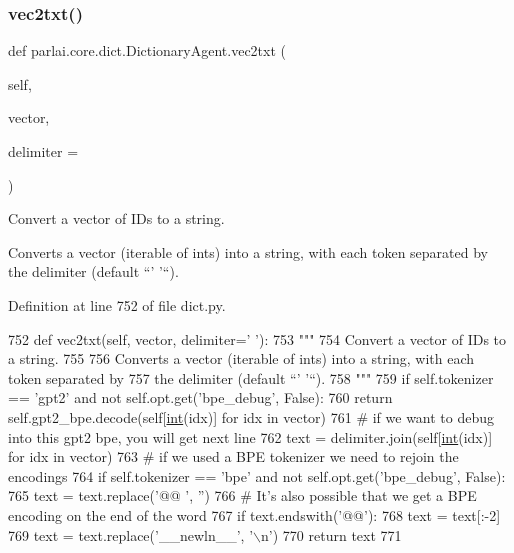 \subsubsection{\texorpdfstring{vec2txt()}{vec2txt()}}
{\footnotesize\ttfamily def parlai.\+core.\+dict.\+Dictionary\+Agent.\+vec2txt (\begin{DoxyParamCaption}\item[{}]{self,  }\item[{}]{vector,  }\item[{}]{delimiter = {\ttfamily \textquotesingle{}~\textquotesingle{}} }\end{DoxyParamCaption})}

\begin{DoxyVerb}Convert a vector of IDs to a string.

Converts a vector (iterable of ints) into a string, with each token separated by
the delimiter (default ``' '``).
\end{DoxyVerb}
 

Definition at line 752 of file dict.\+py.


\begin{DoxyCode}
752     \textcolor{keyword}{def }vec2txt(self, vector, delimiter=' '):
753         \textcolor{stringliteral}{"""}
754 \textcolor{stringliteral}{        Convert a vector of IDs to a string.}
755 \textcolor{stringliteral}{}
756 \textcolor{stringliteral}{        Converts a vector (iterable of ints) into a string, with each token separated by}
757 \textcolor{stringliteral}{        the delimiter (default ``' '``).}
758 \textcolor{stringliteral}{        """}
759         \textcolor{keywordflow}{if} self.tokenizer == \textcolor{stringliteral}{'gpt2'} \textcolor{keywordflow}{and} \textcolor{keywordflow}{not} self.opt.get(\textcolor{stringliteral}{'bpe\_debug'}, \textcolor{keyword}{False}):
760             \textcolor{keywordflow}{return} self.gpt2\_bpe.decode(self[\hyperlink{namespacelanguage__model_1_1eval__ppl_a7d12ee00479673c5c8d1f6d01faa272a}{int}(idx)] \textcolor{keywordflow}{for} idx \textcolor{keywordflow}{in} vector)
761         \textcolor{comment}{# if we want to debug into this gpt2 bpe, you will get next line}
762         text = delimiter.join(self[\hyperlink{namespacelanguage__model_1_1eval__ppl_a7d12ee00479673c5c8d1f6d01faa272a}{int}(idx)] \textcolor{keywordflow}{for} idx \textcolor{keywordflow}{in} vector)
763         \textcolor{comment}{# if we used a BPE tokenizer we need to rejoin the encodings}
764         \textcolor{keywordflow}{if} self.tokenizer == \textcolor{stringliteral}{'bpe'} \textcolor{keywordflow}{and} \textcolor{keywordflow}{not} self.opt.get(\textcolor{stringliteral}{'bpe\_debug'}, \textcolor{keyword}{False}):
765             text = text.replace(\textcolor{stringliteral}{'@@ '}, \textcolor{stringliteral}{''})
766             \textcolor{comment}{# It's also possible that we get a BPE encoding on the end of the word}
767             \textcolor{keywordflow}{if} text.endswith(\textcolor{stringliteral}{'@@'}):
768                 text = text[:-2]
769             text = text.replace(\textcolor{stringliteral}{'\_\_newln\_\_'}, \textcolor{stringliteral}{'\(\backslash\)n'})
770         \textcolor{keywordflow}{return} text
771 
\end{DoxyCode}


